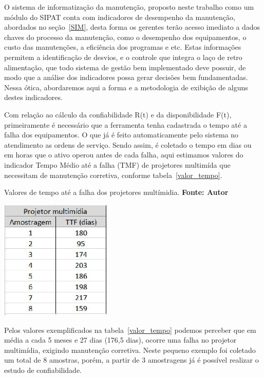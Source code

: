 O sistema de informatização da manutenção, proposto neste trabalho como um módulo do SIPAT conta com indicadores de desempenho da manutenção, abordados no seção~\ref{SIM}, desta forma os gerentes terão acesso imediato a dados chaves do processo da manutenção, como o desempenho dos equipamentos, o custo das manutenções, a eficiência dos programas e etc. Estas informações permitem a identificação de desvios, e o controle que integra o laço de retro alimentação, que todo sistema de gestão bem implementado deve possuir, de modo que a análise dos indicadores possa gerar decisões bem fundamentadas. Nessa ótica, abordaremos aqui a forma e a metodologia de exibição de alguns destes indicadores.

Com relação ao cálculo da confiabilidade R(t) e da disponibilidade F(t), primeiramente é necessário que a ferramenta tenha cadastrada o tempo até a falha dos equipamentos. O que já é feito automaticamente pelo sistema no atendimento as ordens de serviço. Sendo assim, é coletado o tempo em dias ou em horas que o ativo operou antes de cada falha, aqui estimamos valores do indicador Tempo Médio até a falha (TMF) de projetores multimída que necessitam de manutenção corretiva, conforme tabela~\ref{valor_tempo}. 

\graphicspath{{figuras/}}	
\begin{table}[H]
\centering
\caption{Valores de tempo até a falha dos projetores multímidia. \textbf{Fonte: Autor}}
\includegraphics[width=0.4\textwidth]{valores_tempo_falha.eps}
\label{valor_tempo}
\end{table}

Pelos valores exemplificados na tabela~\ref{valor_tempo} podemos perceber que em média a cada 5 meses e 27 dias (176,5 dias), ocorre uma falha no projetor multimídia, exigindo manutenção corretiva. Neste pequeno exemplo foi coletado um total de 8 amostras, porém, a partir de 3 amostragens já é possível realizar o estudo de confiabilidade.

